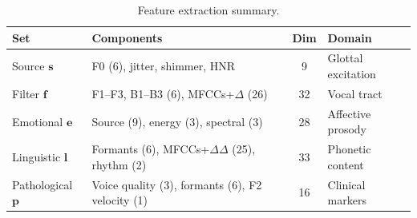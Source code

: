 \begin{table}[t]
\centering
\caption{Feature extraction summary.}
\label{tab:features}
\begin{tabular}{llcl}
\toprule
\textbf{Set} & \textbf{Components} & \textbf{Dim} & \textbf{Domain} \\
\midrule
Source $\mathbf{s}$ & F0 (6), jitter, shimmer, HNR & 9 & Glottal excitation \\
Filter $\mathbf{f}$ & F1--F3, B1--B3 (6), MFCCs+$\Delta$ (26) & 32 & Vocal tract \\
Emotional $\mathbf{e}$ & Source (9), energy (3), spectral (3) & 28 & Affective prosody \\
Linguistic $\mathbf{l}$ & Formants (6), MFCCs+$\Delta\Delta$ (25), rhythm (2) & 33 & Phonetic content \\
Pathological $\mathbf{p}$ & Voice quality (3), formants (6), F2 velocity (1) & 16 & Clinical markers \\
\bottomrule
\end{tabular}
\end{table}

